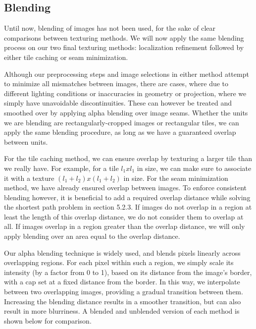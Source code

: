 \documentclass[10pt,twocolumn,letterpaper]{article}
\begin{document}
\subsection{Blending}
Until now, blending of images has not been used, for the sake of clear
comparisons between texturing methods. We will now apply the same
blending process on our two final texturing methods: localization
refinement followed by either tile caching or seam minimization.

Although our preprocessing steps and image selections in either method
attempt to minimize all mismatches between images, there are cases,
where due to different lighting conditions or inaccuracies in geometry
or projection, where we simply have unavoidable discontinuities. These
can however be treated and smoothed over by applying alpha blending
over image seams.  Whether the units we are blending are
rectangularly-cropped images or rectangular tiles, we can apply the
same blending procedure, as long as we have a guaranteed overlap
between units.

For the tile caching method, we can ensure overlap by texturing a
larger tile than we really have. For example, for a tile $l_1 x l_1$
in size, we can make sure to associate it with a texture $(l_1 + l_2)
x (l_1 + l_2)$ in size. For the seam minimization method, we have
already ensured overlap between images. To enforce consistent blending
however, it is beneficial to add a required overlap distance while
solving the shortest path problem in section 5.2.3. If images do not
overlap in a region at least the length of this overlap distance, we
do not consider them to overlap at all. If images overlap in a region
greater than the overlap distance, we will only apply blending over an
area equal to the overlap distance.

Our alpha blending technique is widely used, and blends pixels
linearly across overlapping regions. For each pixel within such a
region, we simply scale its intensity (by a factor from 0 to 1),
based on its distance from the image's border, with a cap set at a fixed distance from the border. In this way, we interpolate between two
overlapping images, providing a gradual transition between
them. Increasing the blending distance results in a
smoother transition, but can also result in more blurriness. A blended and unblended version of each method is shown below for comparison.

\end{document}
